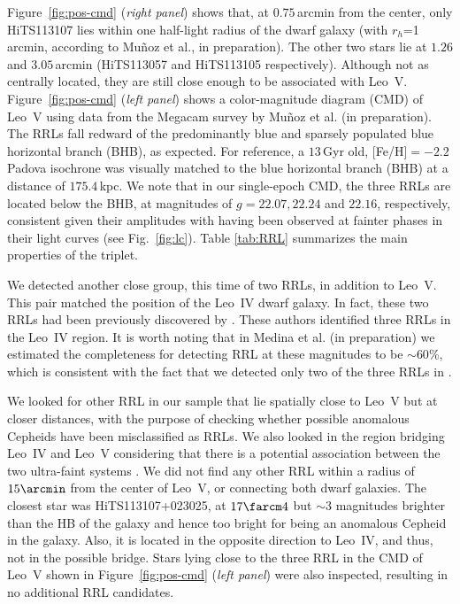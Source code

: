 \documentclass[iop]{emulateapj}
\begin{document}
Figure~\ref{fig:pos-cmd} ({\it right panel}) shows that, at $0.75$\,arcmin from the center, only HiTS113107 lies within one half-light radius of the dwarf galaxy (with $r_h$=1\,arcmin, according to Mu\~noz et al., in preparation).  
The other two stars lie at $1.26$ and $3.05$\,arcmin (HiTS113057 and HiTS113105 respectively).
Although not as centrally located, they are still close enough to be associated with Leo~V.
Figure~\ref{fig:pos-cmd} ({\it left panel}) shows a color-magnitude diagram (CMD) of Leo~V using data from the Megacam survey by Mu\~noz et al. (in preparation).
The RRLs fall redward of the predominantly blue and sparsely populated blue horizontal branch (BHB), as expected. 
For reference, a $13$\,Gyr old, [Fe/H]$=-2.2$ Padova isochrone \citep{girardi04a, bertelli08a} was visually matched to the blue horizontal branch (BHB) at a distance of $175.4$\,kpc. We note that in our single-epoch CMD, the three RRLs are located below the BHB, at magnitudes of $g=22.07, 22.24$ and $22.16$, respectively, consistent given their amplitudes with having been observed at fainter phases in their light curves (see Fig.~\ref{fig:lc}). 
Table \ref{tab:RRL} summarizes the main properties of the triplet. 

We detected another close group, this time of two RRLs, in addition to Leo~V. 
This pair matched the position of the Leo~IV dwarf galaxy. 
In fact, these two RRLs had been previously discovered by \citet{Moretti2009}. 
These authors identified three RRLs in the Leo~IV region. 
It is worth noting that in Medina et al. (in preparation) we estimated the completeness for detecting RRL at these magnitudes to be $\sim60$\%, which is consistent with the fact that we detected only two of the three RRLs in \citet{Moretti2009}.

We looked for other RRL in our sample that lie spatially close to Leo~V but at closer distances, with the purpose of checking whether possible anomalous Cepheids have been misclassified as RRLs. 
We also looked in the region bridging Leo~IV and Leo~V considering that there is a potential association between the two ultra-faint systems \citep{deJong2010, Blana2012, Jin2012}.
We did not find any other RRL within a radius of $15\arcmin$ from the center of Leo~V, or connecting both dwarf galaxies. 
The closest star was HiTS113107+023025, at $17\farcm 4$ but $\sim 3$ magnitudes brighter than the HB of the galaxy and hence too bright for being an anomalous Cepheid in the galaxy. 
Also, it is located in the opposite direction to Leo~IV, and thus, not in the possible bridge. 
Stars lying close to the three RRL in the CMD of Leo~V shown in Figure~\ref{fig:pos-cmd} ({\it left panel}) were also inspected, resulting in no additional RRL candidates.
\end{document}
